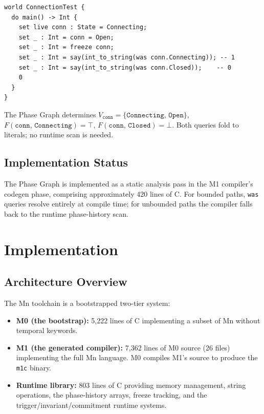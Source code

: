 \documentclass[11pt,a4paper]{article}
\begin{document}
\begin{lstlisting}[style=Mn,caption={Phase Graph example: connection lifecycle.}]
world ConnectionTest {
  do main() -> Int {
    set live conn : State = Connecting;
    set _ : Int = conn = Open;
    set _ : Int = freeze conn;
    set _ : Int = say(int_to_string(was conn.Connecting)); -- 1
    set _ : Int = say(int_to_string(was conn.Closed));    -- 0
    0
  }
}
\end{lstlisting}

The Phase Graph determines $V_{\texttt{conn}} = \{\texttt{Connecting},\,\texttt{Open}\}$,
$F(\texttt{conn},\,\texttt{Connecting}) = \top$, $F(\texttt{conn},\,\texttt{Closed}) = \bot$.
Both queries fold to literals; no runtime scan is needed.

\subsection{Implementation Status}

The Phase Graph is implemented as a static analysis pass in the M1 compiler's codegen phase,
comprising approximately 420 lines of C. For bounded paths, \texttt{was} queries resolve
entirely at compile time; for unbounded paths the compiler falls back to the runtime
phase-history scan.

\section{Implementation}
\label{sec:impl}

\subsection{Architecture Overview}

The Mn toolchain is a bootstrapped two-tier system:

\begin{itemize}[leftmargin=*,itemsep=2pt]
  \item \textbf{M0 (the bootstrap):} 5,222 lines of C implementing a subset of Mn without
    temporal keywords.
  \item \textbf{M1 (the generated compiler):} 7,362 lines of M0 source (26 files) implementing
    the full Mn language. M0 compiles M1's source to produce the \texttt{m1c} binary.
  \item \textbf{Runtime library:} 803 lines of C providing memory management, string
    operations, the phase-history arrays, freeze tracking, and the trigger/invariant/commitment
    runtime systems.
\end{itemize}
\end{document}
